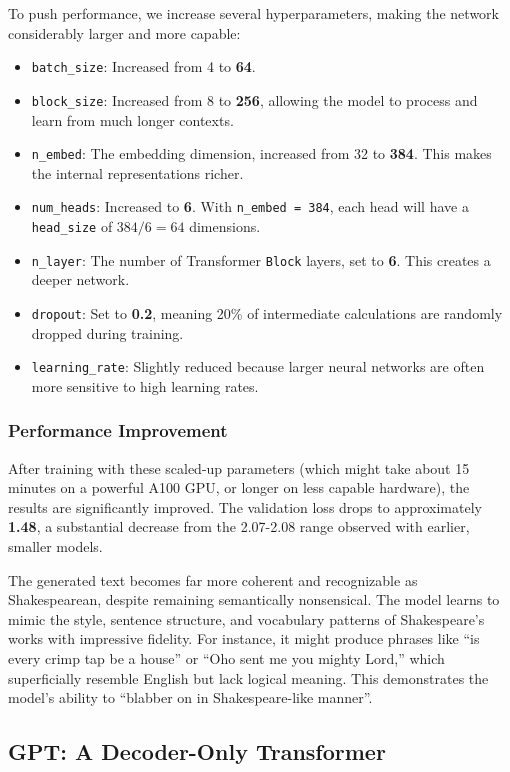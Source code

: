 To push performance, we increase several hyperparameters, making the network considerably larger and more capable:
\begin{itemize}
    \item \texttt{batch\_size}: Increased from 4 to \textbf{64}.
    \item \texttt{block\_size}: Increased from 8 to \textbf{256}, allowing the model to process and learn from much longer contexts.
    \item \texttt{n\_embed}: The embedding dimension, increased from 32 to \textbf{384}. This makes the internal representations richer.
    \item \texttt{num\_heads}: Increased to \textbf{6}. With \texttt{n\_embed = 384}, each head will have a \texttt{head\_size} of $384 / 6 = 64$ dimensions.
    \item \texttt{n\_layer}: The number of Transformer \texttt{Block} layers, set to \textbf{6}. This creates a deeper network.
    \item \texttt{dropout}: Set to \textbf{0.2}, meaning 20\% of intermediate calculations are randomly dropped during training.
    \item \texttt{learning\_rate}: Slightly reduced because larger neural networks are often more sensitive to high learning rates.
\end{itemize}

\subsubsection{Performance Improvement}

After training with these scaled-up parameters (which might take about 15 minutes on a powerful A100 GPU, or longer on less capable hardware), the results are significantly improved. The validation loss drops to approximately \textbf{1.48}, a substantial decrease from the 2.07-2.08 range observed with earlier, smaller models.

The generated text becomes far more coherent and recognizable as Shakespearean, despite remaining semantically nonsensical. The model learns to mimic the style, sentence structure, and vocabulary patterns of Shakespeare's works with impressive fidelity. For instance, it might produce phrases like ``is every crimp tap be a house'' or ``Oho sent me you mighty Lord,'' which superficially resemble English but lack logical meaning. This demonstrates the model's ability to ``blabber on in Shakespeare-like manner''.

\subsection{GPT: A Decoder-Only Transformer}

